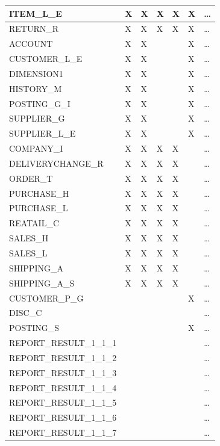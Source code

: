 \documentclass{cslthse-msc}
\begin{document}
\begin{appendices}
\begin{table}[H]
{\begin{tabular}{ l | p{5em} | p{5em}| p{5em}| p{5em}| l l|  }
	 ITEM\_L\_E& X & X & X & X & X & \dots \\ \hline
	 RETURN\_R & X & X & X & X & X & \dots \\ \hline
	 ACCOUNT & X & X &  &  & X & \dots \\ \hline
	 CUSTOMER\_L\_E & X & X &  &  & X & \dots \\ \hline
	 DIMENSION1 & X & X &  &  & X & \dots \\ \hline
	 HISTORY\_M & X & X &  &  & X & \dots \\ \hline
	 POSTING\_G\_I& X & X &  &  & X & \dots \\ \hline
	 SUPPLIER\_G & X & X &  &  & X & \dots \\ \hline
	 SUPPLIER\_L\_E & X & X &  &  & X & \dots \\ \hline
	 COMPANY\_I & X & X & X & X &  & \dots \\ \hline
	 DELIVERYCHANGE\_R & X & X & X & X &  & \dots \\ \hline
	 ORDER\_T & X & X & X & X &  & \dots \\ \hline
	 PURCHASE\_H & X & X & X & X &  & \dots \\ \hline
	 PURCHASE\_L & X & X & X & X &  & \dots \\ \hline
	 REATAIL\_C & X & X & X & X &  & \dots \\ \hline
	 SALES\_H & X & X & X & X &  & \dots \\ \hline
	 SALES\_L & X & X & X & X &  & \dots \\ \hline
	 SHIPPING\_A & X & X & X & X &  & \dots \\ \hline
	 SHIPPING\_A\_S & X & X & X & X &  & \dots \\ \hline
	 CUSTOMER\_P\_G &  &  &  &  & X & \dots \\ \hline
	 DISC\_C &  &  &  &  &  & \dots \\ \hline
	 POSTING\_S &  &  &  &  & X & \dots \\ \hline
	 REPORT\_RESULT\_1\_1\_1 &  &  &  &  &  & \dots \\ \hline
	 REPORT\_RESULT\_1\_1\_2 &  &  &  &  &  & \dots \\ \hline
	 REPORT\_RESULT\_1\_1\_3 &  &  &  &  &  & \dots \\ \hline
	 REPORT\_RESULT\_1\_1\_4 &  &  &  &  &  & \dots \\ \hline
	 REPORT\_RESULT\_1\_1\_5 &  &  &  &  &  & \dots \\ \hline
	 REPORT\_RESULT\_1\_1\_6 &  &  &  &  &  & \dots \\ \hline
	 REPORT\_RESULT\_1\_1\_7 &  &  &  &  &  & \dots \\ \hline

\end{tabular}}
\end{table}
\end{appendices}
\end{document}
